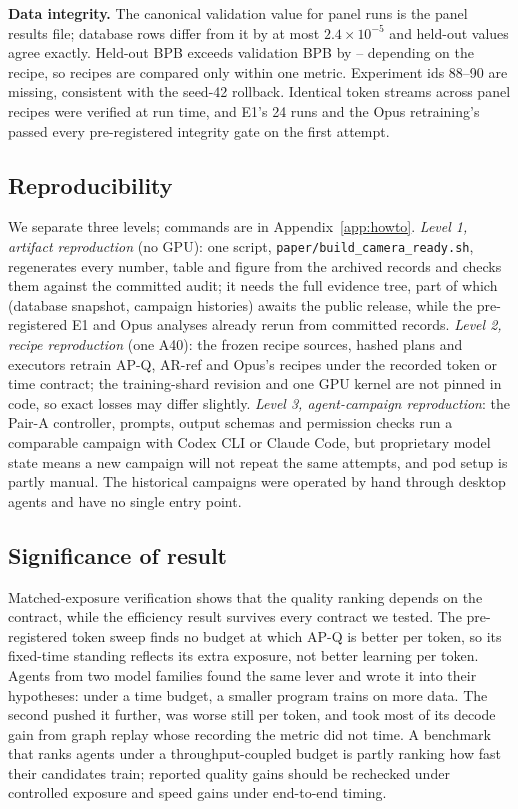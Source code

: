 \documentclass{article}
\newif\ifshowhumanmarkers \showhumanmarkersfalse
\newcommand{\humantag}[1]{{\color{humanframe}\sffamily\scriptsize\bfseries HUMAN AUTHOR MUST REWRITE/VERIFY [#1]}\ }
\newcommand{\humanauthor}[2][]{\ifshowhumanmarkers\begin{humanbox}\humantag{#1}#2\end{humanbox}\else #2\par\fi}
\begin{document}
\humanauthor[P2-11]{\textbf{Data integrity.} The canonical validation value for panel runs is the panel results file; database rows differ from it by at most $2.4\times10^{-5}$ and held-out values agree exactly. Held-out BPB exceeds validation BPB by \CRHeldValOffLo--\CRHeldValOffHi{} depending on the recipe, so recipes are compared only within one metric. Experiment ids 88--90 are missing, consistent with the seed-42 rollback. Identical token streams across panel recipes were verified at run time, and E1's 24 runs and the Opus retraining's \CRMTRuns{} passed every pre-registered integrity gate on the first attempt.}

\subsection{Reproducibility}\label{sec:reproduce}
\humanauthor[P2-17]{We separate three levels; commands are in Appendix~\ref{app:howto}. \emph{Level 1, artifact reproduction} (no GPU): one script, \texttt{paper/build\_camera\_ready.sh}, regenerates every number, table and figure from the archived records and checks them against the committed audit; it needs the full evidence tree, part of which (database snapshot, campaign histories) awaits the public release, while the pre-registered E1 and Opus analyses already rerun from committed records. \emph{Level 2, recipe reproduction} (one A40): the frozen recipe sources, hashed plans and executors retrain AP-Q, AR-ref and Opus's recipes under the recorded token or time contract; the training-shard revision and one GPU kernel are not pinned in code, so exact losses may differ slightly. \emph{Level 3, agent-campaign reproduction}: the Pair-A controller, prompts, output schemas and permission checks run a comparable campaign with Codex CLI or Claude Code, but proprietary model state means a new campaign will not repeat the same attempts, and pod setup is partly manual. The historical campaigns were operated by hand through desktop agents and have no single entry point.}

\subsection{Significance of result}
\humanauthor[P2-12]{Matched-exposure verification shows that the quality ranking depends on the contract, while the efficiency result survives every contract we tested. The pre-registered token sweep finds no budget at which AP-Q is better per token, so its fixed-time standing reflects its extra exposure, not better learning per token. Agents from two model families found the same lever and wrote it into their hypotheses: under a time budget, a smaller program trains on more data. The second pushed it further, was worse still per token, and took most of its decode gain from graph replay whose recording the metric did not time. A benchmark that ranks agents under a throughput-coupled budget is partly ranking how fast their candidates train; reported quality gains should be rechecked under controlled exposure and speed gains under end-to-end timing.}
\end{document}
